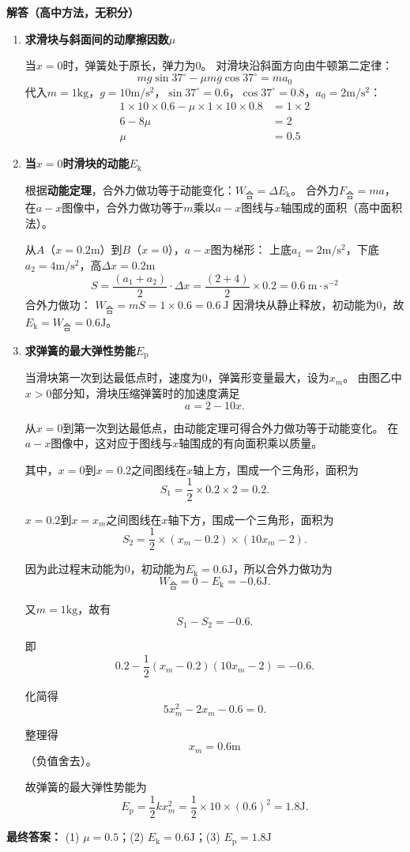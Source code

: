 \documentclass[a4paper,10pt]{ctexart}
\begin{document}
\newpage
\textbf{解答（高中方法，无积分）}
\begin{enumerate}
	\item 
\textbf{求滑块与斜面间的动摩擦因数$\mu$}

当$x=0$时，弹簧处于原长，弹力为$0$。
对滑块沿斜面方向由牛顿第二定律：
\[
mg\sin37^\circ - \mu mg\cos37^\circ = ma_0
\]
代入$m=1\mathrm{kg}$，$g=10\mathrm{m/s^2}$，$\sin37^\circ=0.6$，$\cos37^\circ=0.8$，$a_0=2\mathrm{m/s^2}$：
\begin{align*}
	1\times10\times0.6 - \mu\times1\times10\times0.8 &= 1\times2 \\
	6 - 8\mu &= 2 \\
	\mu &= 0.5
\end{align*}


\item 
\textbf{当$x=0$时滑块的动能$E_\text{k}$}

根据\textbf{动能定理}，合外力做功等于动能变化：$W_\text{合} = \Delta E_\text{k}$。
合外力$F_\text{合}=ma$，在$a-x$图像中，合外力做功等于$m$乘以$a-x$图线与$x$轴围成的面积（高中面积法）。

从$A$（$x=0.2\mathrm{m}$）到$B$（$x=0$），$a-x$图为梯形：
上底$a_1=2\mathrm{m/s^2}$，下底$a_2=4\mathrm{m/s^2}$，高$\Delta x=0.2\mathrm{m}$
\[
S = \frac{(a_1+a_2)}{2} \cdot \Delta x = \frac{(2+4)}{2} \times 0.2 = 0.6\ \mathrm{m\cdot s^{-2}}
\]
合外力做功：
$
W_\text{合} = mS = 1\times0.6 = 0.6\ \mathrm{J}
$
因滑块从静止释放，初动能为$0$，故$E_\text{k} = W_\text{合} = 0.6\mathrm{J}$。

\item 
\textbf{求弹簧的最大弹性势能$E_\text{p}$}

当滑块第一次到达最低点时，速度为$0$，弹簧形变量最大，设为$x_m$。
由图乙中$x>0$部分知，滑块压缩弹簧时的加速度满足
\[
a=2-10x.
\]

从$x=0$到第一次到达最低点，由动能定理可得合外力做功等于动能变化。
在$a-x$图像中，这对应于图线与$x$轴围成的有向面积乘以质量。

其中，$x=0$到$x=0.2$之间图线在$x$轴上方，围成一个三角形，面积为
\[
S_1=\frac12\times 0.2\times 2=0.2.
\]

$x=0.2$到$x=x_m$之间图线在$x$轴下方，围成一个三角形，面积为
\[
S_2=\frac12\times (x_m-0.2)\times (10x_m-2).
\]

因为此过程末动能为$0$，初动能为$E_\text{k}=0.6\mathrm{J}$，所以合外力做功为
\[
W_\text{合}=0-E_\text{k}=-0.6\mathrm{J}.
\]

又$m=1\mathrm{kg}$，故有
\[
S_1-S_2=-0.6.
\]

即
\[
0.2-\frac12(x_m-0.2)(10x_m-2)=-0.6.
\]

化简得
\[
5x_m^2-2x_m-0.6=0.
\]

整理得
\[
x_m=0.6\mathrm{m}
\]
（负值舍去）。

故弹簧的最大弹性势能为
\[
E_\text{p}=\frac12 kx_m^2=\frac12\times10\times(0.6)^2=1.8\mathrm{J}.
\]
\end{enumerate}
\noindent
\textbf{最终答案：}
(1) $\boxed{\mu=0.5}$；(2) $\boxed{E_\text{k}=0.6\mathrm{J}}$；(3) $\boxed{E_\text{p}=1.8\mathrm{J}}$
\end{document}
